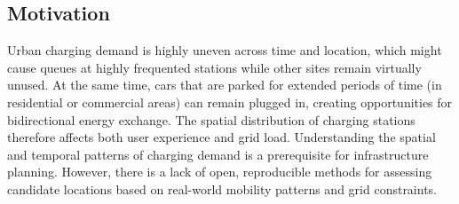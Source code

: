 \subsection{Motivation}
\label{subsec:motivation}
Urban charging demand is highly uneven across time and location, which might cause queues at highly frequented stations while other sites remain virtually unused. At the same time, cars that are parked for extended periods of time (in residential or commercial areas) can remain plugged in, creating opportunities for bidirectional energy exchange. The spatial distribution of charging stations therefore affects both user experience and grid load. Understanding the spatial and temporal patterns of charging demand is a prerequisite for infrastructure planning. However, there is a lack of open, reproducible methods for assessing candidate locations based on real-world mobility patterns and grid constraints.
 